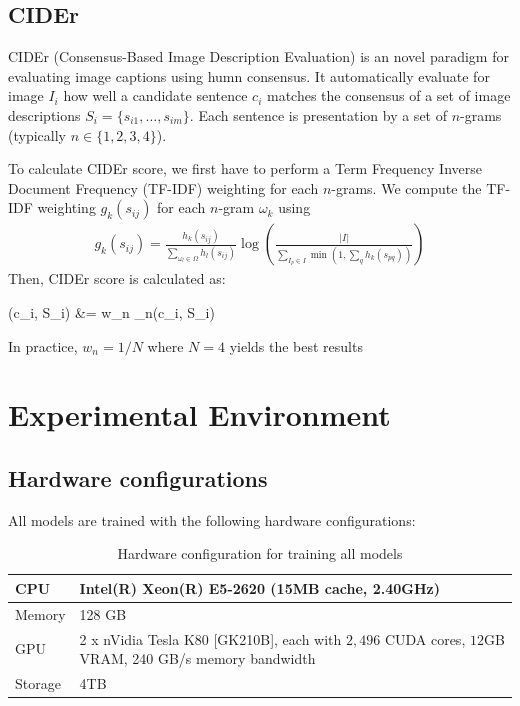 \subsection{CIDEr}
CIDEr (Consensus-Based Image Description Evaluation) \cite{DBLP:journals/corr/VedantamZP14a} is an novel paradigm for evaluating image captions using humn consensus. It automatically evaluate for image $I_i$ how well a candidate sentence $c_i$ matches the consensus of a set of image descriptions $S_i = \{s_{i1}, \dots, s_{im}\}$. Each sentence is presentation by a set of $n$-grams (typically $n \in \{1, 2, 3, 4\}$).

To calculate CIDEr score, we first have to perform a Term Frequency Inverse Document Frequency (TF-IDF) weighting for each $n$-grams. We compute the TF-IDF weighting $g_k\left(s_{ij}\right)$ for each $n$-gram $\omega_k$ using
\begin{align}
	g_k\left(s_{ij}\right) = \frac{h_k\left(s_{ij}\right)}{\sum_{\omega_l \in \Omega} h_l \left(s_{ij}\right)} \log \left( \frac{|I|}{\sum_{I_p \in I} \min \left( 1, \sum_q h_k \left(s_{pq} \right)\right)}  \right)
\end{align}
Then, CIDEr score is calculated as:
\begin{tcolorbox}[ams align, colback=yellow!10!white,colframe=bordeuxcolor]
	\centering
	\left(c_i, S_i\right) &=  w_n _n\left(c_i, S_i\right)
\end{tcolorbox}
In practice, $w_n = 1/N$ where $N = 4$ yields the best results

\section{Experimental Environment}
\label{sec:chap4_environment}

\subsection{Hardware configurations}
All models are trained with the following hardware configurations:

\begin{table}
	\centering
	\label{tab:hardware_configuration}
	\caption{Hardware configuration for training all models}
	\begin{tabular}{|l|l|}
		\hline
		CPU & Intel(R) Xeon(R) E5-2620 (15MB cache, 2.40GHz) \\ \hline
		Memory & 128 GB \\ \hline
		GPU & 2 x nVidia Tesla K80 [GK210B], each with $2,496$ CUDA cores, $12$GB VRAM, 240 GB/s memory bandwidth \\ \hline
		Storage & 4TB \\ \hline
	\end{tabular}
\end{table}

